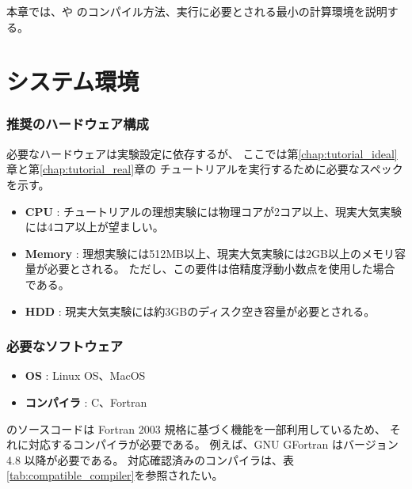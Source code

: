 
本章では、\scalelib や \scalerm のコンパイル方法、実行に必要とされる最小の計算環境を説明する。

\section{システム環境} \label{sec:req_env}
\subsubsection{\bf 推奨のハードウェア構成}

必要なハードウェアは実験設定に依存するが、
ここでは第\ref{chap:tutorial_ideal}章と第\ref{chap:tutorial_real}章の
チュートリアルを実行するために必要なスペックを示す。

  \begin{itemize}
    \item {\bf CPU} : チュートリアルの理想実験には物理コアが2コア以上、現実大気実験には4コア以上が望ましい。
    \item {\bf Memory} : 理想実験には512MB以上、現実大気実験には2GB以上のメモリ容量が必要とされる。 ただし、この要件は倍精度浮動小数点を使用した場合である。
    \item {\bf HDD} : 現実大気実験には約3GBのディスク空き容量が必要とされる。
  \end{itemize}

\subsubsection{\bf 必要なソフトウェア}
  \begin{itemize}
  \item {\bf OS} : Linux OS、MacOS
  \item {\bf コンパイラ} : C、Fortran
  \end{itemize}

  \scalelib のソースコードは Fortran 2003 規格に基づく機能を一部利用しているため、
  それに対応するコンパイラが必要である。
  例えば、GNU GFortran はバージョン 4.8 以降が必要である。
  対応確認済みのコンパイラは、表\ref{tab:compatible_compiler}を参照されたい。

